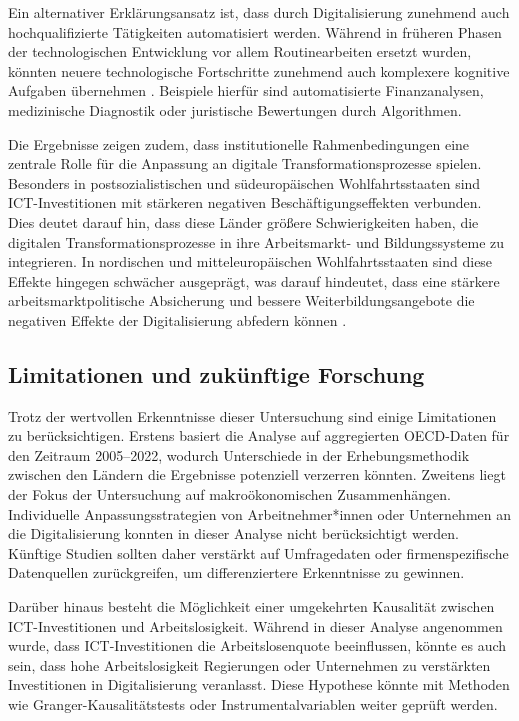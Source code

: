 Ein alternativer Erklärungsansatz ist, dass durch Digitalisierung zunehmend auch 
hochqualifizierte Tätigkeiten automatisiert werden. Während in früheren Phasen der 
technologischen Entwicklung vor allem Routinearbeiten ersetzt wurden, könnten neuere 
technologische Fortschritte zunehmend auch komplexere kognitive Aufgaben übernehmen 
\parencite[vgl.][S. 2-4]{frey2017futureemployment}. Beispiele hierfür sind automatisierte 
Finanzanalysen, medizinische Diagnostik oder juristische Bewertungen durch Algorithmen.

Die Ergebnisse zeigen zudem, dass institutionelle Rahmenbedingungen eine zentrale Rolle 
für die Anpassung an digitale Transformationsprozesse spielen. Besonders in 
postsozialistischen und südeuropäischen Wohlfahrtsstaaten sind \ac{ICT}-Investitionen mit 
stärkeren negativen Beschäftigungseffekten verbunden. Dies deutet darauf hin, dass diese 
Länder größere Schwierigkeiten haben, die digitalen Transformationsprozesse in ihre 
Arbeitsmarkt- und Bildungssysteme zu integrieren. In nordischen und mitteleuropäischen 
Wohlfahrtsstaaten sind diese Effekte hingegen schwächer ausgeprägt, was darauf hindeutet, 
dass eine stärkere arbeitsmarktpolitische Absicherung und bessere Weiterbildungsangebote 
die negativen Effekte der Digitalisierung abfedern können 
\parencite[vgl.][S. 27-30]{espingandersen1990thethree}.

\subsection{Limitationen und zukünftige Forschung}

Trotz der wertvollen Erkenntnisse dieser Untersuchung sind einige Limitationen zu 
berücksichtigen. Erstens basiert die Analyse auf aggregierten \ac{OECD}-Daten für den 
Zeitraum 2005–2022, wodurch Unterschiede in der Erhebungsmethodik zwischen den 
Ländern die Ergebnisse potenziell verzerren könnten. Zweitens liegt der Fokus der 
Untersuchung auf makroökonomischen Zusammenhängen. Individuelle Anpassungsstrategien 
von Arbeitnehmer*innen oder Unternehmen an die Digitalisierung konnten in dieser 
Analyse nicht berücksichtigt werden. Künftige Studien sollten daher verstärkt auf 
Umfragedaten oder firmenspezifische Datenquellen zurückgreifen, um differenziertere 
Erkenntnisse zu gewinnen.

Darüber hinaus besteht die Möglichkeit einer umgekehrten Kausalität zwischen ICT-Investitionen 
und Arbeitslosigkeit. Während in dieser Analyse angenommen wurde, dass ICT-Investitionen 
die Arbeitslosenquote beeinflussen, könnte es auch sein, dass hohe Arbeitslosigkeit 
Regierungen oder Unternehmen zu verstärkten Investitionen in Digitalisierung veranlasst. 
Diese Hypothese könnte mit Methoden wie Granger-Kausalitätstests oder Instrumentalvariablen 
weiter geprüft werden.

